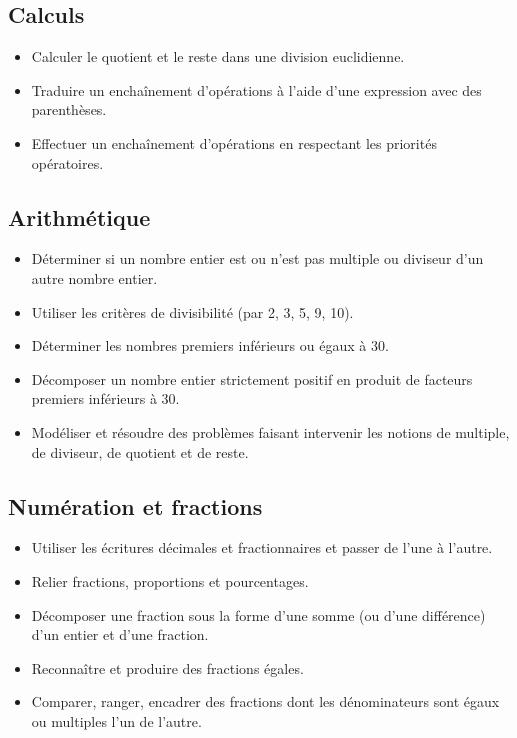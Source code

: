 \documentclass[a4paper,12pt,fleqn]{article}
\begin{document}
\renewcommand{\labelitemi}{}

\subsection*{Calculs}

\begin{itemize}
	\item {}	Calculer le quotient et le reste dans une division euclidienne.
	\item {}	Traduire un enchaînement d’opérations à l’aide d’une expression avec des parenthèses.
	\item {}	Effectuer un enchaînement d’opérations en respectant les priorités opératoires.
\end{itemize}

\subsection*{Arithmétique}

\begin{itemize}
	\item {}	Déterminer si un nombre entier est ou n’est pas multiple ou diviseur d’un autre nombre entier.
	\item {}	Utiliser les critères de divisibilité (par 2, 3, 5, 9, 10).
	\item {}	Déterminer les nombres premiers inférieurs ou égaux à 30.
	\item {}	Décomposer un nombre entier strictement positif en produit de facteurs premiers inférieurs à 30.
	\item {}	Modéliser et résoudre des problèmes faisant intervenir les notions de multiple, de diviseur, de quotient et de reste.
\end{itemize}

\subsection*{Numération et fractions}

\begin{itemize}
	\item {}	Utiliser les écritures décimales et fractionnaires et passer de l’une à l’autre.
	\item {}	Relier fractions, proportions et pourcentages.
	\item {}	Décomposer une fraction sous la forme d’une somme (ou d’une différence) d’un entier et d'une fraction.
	\item {}	Reconnaître et produire des fractions égales.
	\item {}	Comparer, ranger, encadrer des fractions dont les dénominateurs sont égaux ou multiples l’un de l'autre.
\end{itemize}
\end{document}
